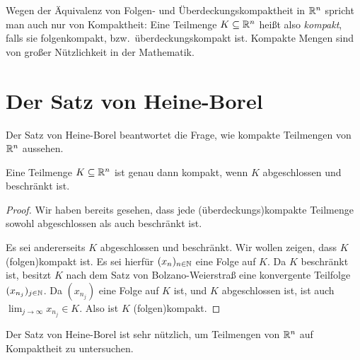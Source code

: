 \documentclass[a4paper,10pt]{article}
\begin{document}
Wegen der Äquivalenz von Folgen- und Überdeckungskompaktheit in $\mathbb{R}^n$ spricht man auch nur von Kompaktheit: Eine Teilmenge $K \subseteq \mathbb{R}^n$ heißt also \emph{kompakt}, falls sie folgenkompakt, bzw.\ überdeckungskompakt ist. Kompakte Mengen sind von großer Nützlichkeit in der Mathematik.




\section{Der Satz von Heine-Borel}
Der Satz von Heine-Borel beantwortet die Frage, wie kompakte Teilmengen von $\mathbb{R}^n$ aussehen.


\begin{thrm}
 Eine Teilmenge $K \subseteq \mathbb{R}^n$ ist genau dann kompakt, wenn $K$ abgeschlossen und beschränkt ist.
\end{thrm}
\begin{proof}
 Wir haben bereits gesehen, dass jede (überdeckungs)kompakte Teilmenge sowohl abgeschlossen als auch beschränkt ist.
 
 Es sei andererseits $K$ abgeschlossen und beschränkt. Wir wollen zeigen, dass $K$ (folgen)kompakt ist. Es sei hierfür $(x_n)_{n \in \mathbb{N}}$ eine Folge auf $K$. Da $K$ beschränkt ist, besitzt $K$ nach dem Satz von Bolzano-Weierstraß eine konvergente Teilfolge $(x_{n_j})_{j \in \mathbb{N}}$. Da $(x_{n_j})$ eine Folge auf $K$ ist, und $K$ abgeschlossen ist, ist auch $\lim_{j \to \infty} x_{n_j} \in K$. Also ist $K$ (folgen)kompakt.
\end{proof}


Der Satz von Heine-Borel ist sehr nützlich, um Teilmengen von $\mathbb{R}^n$ auf Kompaktheit zu untersuchen.
\end{document}
